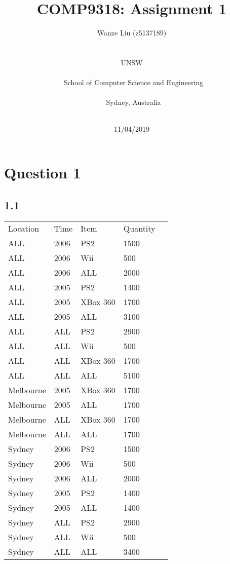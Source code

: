 \documentclass[a4paper,12pt]{article}
\title{COMP9318: Assignment 1}
\author{Wanze Liu (z5137189)\\
\date{11/04/2019}\\
\large  UNSW\\
\\
\ School of Computer Science and Engineering\\\\
\ Sydney, Australia\\
\\
}
\begin{document}
\maketitle

\newpage

\section*{Question 1}

\subsection*{1.1}
\setlength{\parindent}{0pt} %

\begin{Large}
\begin{center}
\begin{tabular}{llllr}
Location &  Time &  Item &  Quantity \\
ALL &  2006 &       PS2 &    1500 \\
ALL &  2006 &       Wii &     500 \\
ALL &  2006 &       ALL &    2000 \\
ALL &  2005 &       PS2 &    1400 \\
ALL &  2005 &  XBox 360 &    1700 \\
ALL &  2005 &       ALL &    3100 \\
ALL &   ALL &       PS2 &    2900 \\
ALL &   ALL &       Wii &     500 \\
ALL &   ALL &  XBox 360 &    1700 \\
ALL &   ALL &       ALL &    5100 \\
Melbourne &  2005 &  XBox 360 &    1700 \\
Melbourne &  2005 &       ALL &    1700 \\
Melbourne &   ALL &  XBox 360 &    1700 \\
Melbourne &   ALL &       ALL &    1700 \\
Sydney &  2006 &       PS2 &    1500 \\
Sydney &  2006 &       Wii &     500 \\
Sydney &  2006 &       ALL &    2000 \\
Sydney &  2005 &       PS2 &    1400 \\
Sydney &  2005 &       ALL &    1400 \\
Sydney &   ALL &       PS2 &    2900 \\
Sydney &   ALL &       Wii &     500 \\
Sydney &   ALL &       ALL &    3400 \\

\end{tabular}
\end{center}
\end{Large}
\end{document}
